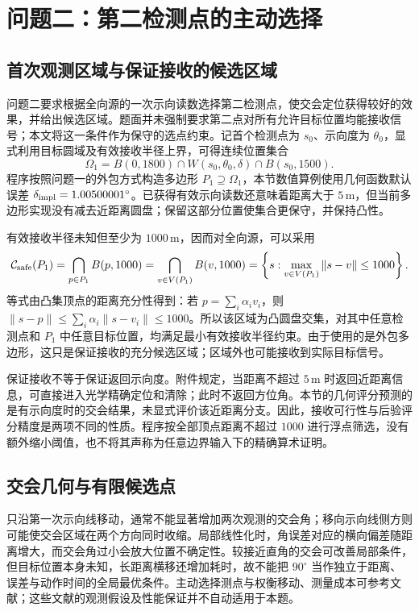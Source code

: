 \section{问题二：第二检测点的主动选择}
\label{sec:q2}

\subsection{首次观测区域与保证接收的候选区域}
问题二要求根据全向源的一次示向读数选择第二检测点，使交会定位获得较好的效果，并给出候选区域。题面并未强制要求第二点对所有允许目标位置均能接收信号；本文将这一条件作为保守的选点约束。记首个检测点为 $s_0$、示向度为 $\theta_0$，显式利用目标圆域及有效接收半径上界，可得连续位置集合
\begin{equation}
 \Omega_1=B(0,1800)\cap W(s_0,\theta_0,\delta)\cap B(s_0,1500).
 \label{eq:q2-prior}
\end{equation}
程序按照问题一的外包方式构造多边形 $P_1\supseteq\Omega_1$，本节数值算例使用几何函数默认误差 $\delta_{\rm impl}=1.00500001^\circ$。已获得有效示向读数还意味着距离大于 $5\,\mathrm m$，但当前多边形实现没有减去近距离圆盘；保留这部分位置使集合更保守，并保持凸性。

有效接收半径未知但至少为 $1000\,\mathrm m$，因而对全向源，可以采用
\begin{equation}
 \mathcal C_{\rm safe}(P_1)
 =\bigcap_{p\in P_1}B(p,1000)
 =\bigcap_{v\in V(P_1)}B(v,1000)
 =\left\{s:\max_{v\in V(P_1)}\|s-v\|\leq1000\right\}.
 \label{eq:q2-safe}
\end{equation}
等式由凸集顶点的距离充分性得到：若 $p=\sum_i\alpha_i v_i$，则 $\|s-p\|\leq\sum_i\alpha_i\|s-v_i\|\leq1000$。所以该区域为凸圆盘交集，对其中任意检测点和 $P_1$ 中任意目标位置，均满足最小有效接收半径约束。由于使用的是外包多边形，这只是保证接收的充分候选区域；区域外也可能接收到实际目标信号。

保证接收不等于保证返回示向度。附件规定，当距离不超过 $5\,\mathrm m$ 时返回近距离信息，可直接进入光学精确定位和清除；此时不返回方位角。本节的几何评分预测的是有示向度时的交会结果，未显式评价该近距离分支。因此，接收可行性与后验评分精度是两项不同的性质。程序按全部顶点距离不超过 $1000$ 进行浮点筛选，没有额外缩小阈值，也不将其声称为任意边界输入下的精确算术证明。

\subsection{交会几何与有限候选点}
只沿第一次示向线移动，通常不能显著增加两次观测的交会角；移向示向线侧方则可能使交会区域在两个方向同时收缩。局部线性化时，角误差对应的横向偏差随距离增大，而交会角过小会放大位置不确定性。较接近直角的交会可改善局部条件，但目标位置本身未知，长距离横移还增加耗时，故不能把 $90^\circ$ 当作独立于距离、误差与动作时间的全局最优条件。主动选择测点与权衡移动、测量成本可参考文献\cite{tokekar2011,vanderhook2014}；这些文献的观测假设及性能保证并不自动适用于本题。

